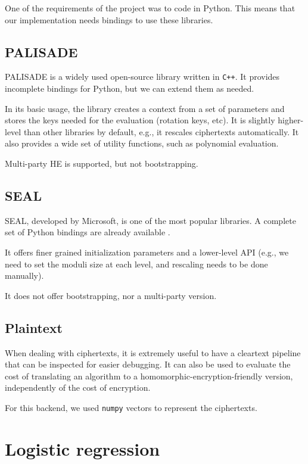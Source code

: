\documentclass[a4paper,11pt,oneside]{report}
\begin{document}
One of the requirements of the project was to code in Python. This means that our implementation needs bindings to use these libraries.

\subsection{PALISADE}

PALISADE is a widely used open-source library written in \texttt{C++}. It provides incomplete bindings for Python, but we can extend them as needed. 

In its basic usage, the library creates a context from a set of parameters and stores the keys needed for the evaluation (rotation keys, etc). It is slightly higher-level than other libraries by default, e.g., it rescales ciphertexts automatically. It also provides a wide set of utility functions, such as polynomial evaluation.

Multi-party HE is supported, but not bootstrapping.

\subsection{SEAL}

SEAL, developed by Microsoft, is one of the most popular libraries. A complete set of Python bindings are already available \cite{hugang_seal-python_2022}.

It offers finer grained initialization parameters and a lower-level API (e.g., we need to set the moduli size at each level, and rescaling needs to be done manually).

It does not offer bootstrapping, nor a multi-party version.

\subsection{Plaintext}

When dealing with ciphertexts, it is extremely useful to have a cleartext pipeline that can be inspected for easier debugging. It can also be used to evaluate the cost of translating an algorithm to a homomorphic-encryption-friendly version, independently of the cost of encryption. 

For this backend, we used \texttt{numpy} vectors to represent the ciphertexts.

\section{Logistic regression}
\end{document}
